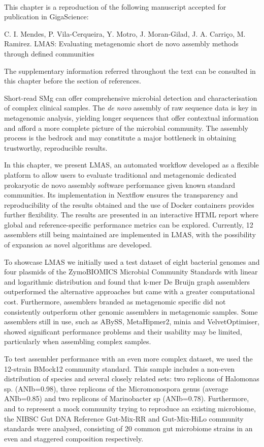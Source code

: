 \mbox{}\\
\vspace{8cm}

This chapter is a reproduction of the following manuscript accepted for publication in GigaScience:

C. I. Mendes, P. Vila-Cerqueira, Y. Motro, J. Moran-Gilad, J. A. Carriço, M. Ramirez. LMAS: Evaluating metagenomic short de novo assembly methods through defined communities

The supplementary information referred throughout the text can be consulted in this chapter before the section of references.

Short-read \ac{SMg} can offer comprehensive microbial detection and characterisation of complex clinical samples. The \textit{de novo} assembly of raw sequence data is key in metagenomic analysis, yielding longer sequences that offer contextual information and afford a more complete picture of the microbial community. The assembly process is the bedrock and may constitute a major bottleneck in obtaining trustworthy, reproducible results.

In this chapter, we present LMAS, an automated workflow developed as a flexible platform to allow users to evaluate traditional and metagenomic dedicated prokaryotic de novo assembly software performance given known standard communities. Its implementation in Nextflow ensures the transparency and reproducibility of the results obtained and the use of Docker containers provides further flexibility. The results are presented in an interactive HTML report where global and reference-specific performance metrics can be explored. Currently, 12 assemblers still being maintained are implemented in LMAS, with the possibility of expansion as novel algorithms are developed.

To showcase LMAS we initially used a test dataset of eight bacterial genomes and four plasmids of the ZymoBIOMICS Microbial Community Standards with linear and logarithmic distribution and found that k-mer De Bruijn graph assemblers outperformed the alternative approaches but came with a greater computational cost. Furthermore, assemblers branded as metagenomic specific did not consistently outperform other genomic assemblers in metagenomic samples. Some assemblers still in use, such as ABySS, MetaHipmer2, minia and VelvetOptimiser,  showed significant performance problems and their usability may be limited, particularly when assembling complex samples. 

To test assembler performance with an even more complex dataset, we used the 12-strain BMock12 community standard. This sample includes a non-even distribution of species and several closely related sets: two replicons of Halomonas sp. (ANIb=0.98), three replicons of the Micromonospora genus (average ANIb=0.85) and two replicons of Marinobacter sp (ANIb=0.78). Furthermore, and to represent a mock community trying to reproduce an existing microbiome, the NIBSC Gut DNA Reference Gut-Mix-RR and Gut-Mix-HiLo community standards were analysed, consisting of 20 common gut microbiome strains in an even and staggered composition respectively.

